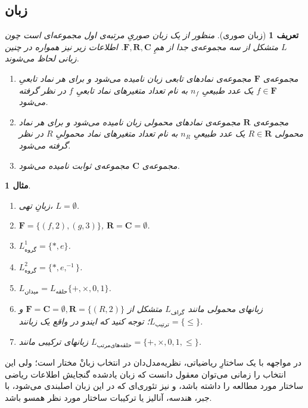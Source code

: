 \documentclass[12pt,a4paper]{article}
\theoremstyle{colorhead}
\newtheorem{mesal}[thm]{مثال}
\newtheorem{defn}[thm]{تعریف}
\begin{document}
\subsection{زبان}
\label{vorud}
\begin{defn}
[زبان صوری]
منظور از یک 
\textit{زبان صوریِ }
مرتبه‌ی اول
مجموعه‌ای است چون
$L$
متشکل از سه مجموعه‌ی جدا از همِ
$\mathbf{F},\mathbf{R},\mathbf{C}$. 
اطلاعات زیر نیز همواره در چنین زبانی لحاظ می‌شوند.
\begin{enumerate}
\item 
مجموعه‌ی
$\mathbf{F}$
مجموعه‌ی نمادهای تابعی زبان نامیده می‌شود و برای هر نماد تابعیِ
$f\in \mathbf{F}$
یک عدد طبیعیِ 
$n_f$
به نام تعداد متغیرهای نماد تابعیِ 
$f$
در نظر گرفته می‌شود. 
\item 
مجموعه‌ی
$\mathbf{R}$
مجموعه‌ی نمادهای محمولی زبان نامیده می‌شود و برای هر نماد محمولی
$R\in \mathbf{R}$
یک عدد طبیعیِ 
$n_R$
به نام تعداد متغیرهای نماد محمولیِ
$R$
در نظر گرفته می‌شود. 
\item 
مجموعه‌ی
$\mathbf{C}$
مجموعه‌ی ثوابت نامیده می‌شود. 
\end{enumerate}
\end{defn}
\begin{mesal}
\begin{enumerate}
\item 
زبانِ تهی،
$L=\emptyset$.
\item 
$\mathbf{F}=\{(f,2),(g,3)\}$, $\mathbf{R}=\mathbf{C}=\emptyset$.
\item 
$L^1_{\text{گروه}}=\{*,e\}$.
\item 
$L^2_{\text{گروه}}=\{*,e,^{-1}\}$.
\item 
$L_{\text{میدان}}=L_{\text{حلقه}}\{+,\times,0,1\}$.
\item 
زبانهای محمولی مانند
$L_{\text{گراف}}$
متشکل از
$\mathbf{F}=\mathbf{C}=\emptyset, \mathbf{R}=\{(R,2)\}$ 
و 
$L_{\text{ترتیب}}=\{\leq\}$؛
توجه کنید که ایندو در واقع یک زبانند.
\item
زبانهای ترکیبی مانند
$L_{\text{حلقه‌های‌مرتب}}=\{+,\times,0,1,\leq\}$.
\end{enumerate}
\end{mesal}
در مواجهه با یک ساختارِ ریاضیاتی، نظریه‌مدل‌دان در 
انتخاب زبانْ مختار است؛ 
ولی
این انتخاب را زمانی می‌توان معقول دانست  که  زبان یادشده گنجایش اطلاعات ریاضی ساختار مورد مطالعه را داشته باشد، و نیز تئوری‌ای که در این زبان اصلبندی می‌شود، 
با جبر،‌ هندسه، آنالیز یا 
ترکیبات ساختار مورد نظر همسو باشد.
\end{document}
